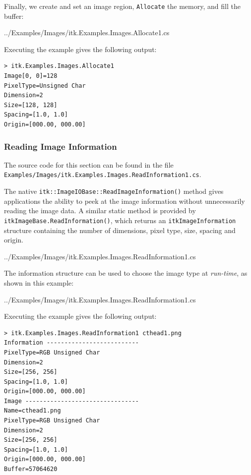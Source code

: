 \documentclass{InsightArticle}
\def\code#1{\texttt{#1}}
\begin{document}
Finally, we create and set an image region, \code{Allocate} the memory,
and fill the buffer:
\begin{center}
	
	{../Examples/Images/itk.Examples.Images.Allocate1.cs}
\end{center}

Executing the example gives the following output:
\begin{lstlisting}
> itk.Examples.Images.Allocate1
Image[0, 0]=128
PixelType=Unsigned Char
Dimension=2
Size=[128, 128]
Spacing=[1.0, 1.0]
Origin=[000.00, 000.00]
\end{lstlisting}

\subsubsection{Reading Image Information}
\label{sec:Examples:ReadImageInformation}
The source code for this section can be found in the file\\
\code{Examples/Images/itk.Examples.Images.ReadInformation1.cs}.

The native \code{itk::ImageIOBase::ReadImageInformation()} method
gives applications the ability to peek at the image information 
without unnecessarily reading the image data. A similar static method
is provided by \code{itkImageBase.ReadInformation()}, which
returns an \code{itkImageInformation} structure containing
the number of dimensions, pixel type, size, spacing and origin.
\begin{center}
	
	{../Examples/Images/itk.Examples.Images.ReadInformation1.cs}
\end{center}

The information structure can be used to choose the image type
at \emph{run-time}, as shown in this example:
\begin{center}
	
	{../Examples/Images/itk.Examples.Images.ReadInformation1.cs}
\end{center}

Executing the example gives the following output:
\begin{lstlisting}
> itk.Examples.Images.ReadInformation1 cthead1.png
Information --------------------------
PixelType=RGB Unsigned Char
Dimension=2
Size=[256, 256]
Spacing=[1.0, 1.0]
Origin=[000.00, 000.00]
Image --------------------------------
Name=cthead1.png
PixelType=RGB Unsigned Char
Dimension=2
Size=[256, 256]
Spacing=[1.0, 1.0]
Origin=[000.00, 000.00]
Buffer=57064620
\end{lstlisting}
\end{document}
